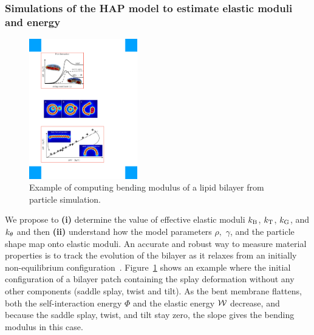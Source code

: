 \subsubsection{Simulations of the HAP model to estimate elastic moduli
and energy}
%
%
%
\begin{figure}
\centerline{\includegraphics[width=0.42\textwidth]{Figures/Flattening.pdf}}
\caption{\label{fig:flattening} \footnotesize Example of computing
  bending modulus of a lipid bilayer from particle simulation.}
\end{figure}
We propose to {\bf (i)} determine the value of effective elastic moduli
$k_{\mathrm{B}}$, $k_{\mathrm{T}}$, $k_{\mathrm{G}}$, and $k_{\theta}$ and then {\bf (ii)} understand how the
model parameters $\rho,$ $\gamma$, and the particle shape map onto
elastic moduli. An accurate and robust way to measure material
properties is to track the evolution of the bilayer as it relaxes from
an initially non-equilibrium
configuration~\cite{PhysRevLett.117.188102}.
Figure~\ref{fig:flattening} shows an example where the initial
configuration of a bilayer patch containing the splay deformation
without any other components (saddle splay, twist and tilt). As the bent
membrane flattens, both the self-interaction energy $\Phi$ and the
elastic energy ${\cal W}$ decrease, and because the saddle splay, twist,
and tilt stay zero, the slope gives the bending modulus in this case. 


